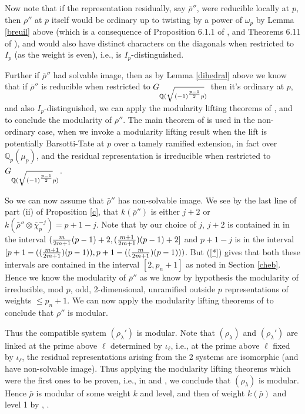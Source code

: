 \documentclass[12pt]{amsart}
\newcommand{\Q}{\mathbb{Q}}
\newcommand{\rhobar}{\overline{\rho}}
\def\rhobar{ {\bar {\rho} } }
\begin{document}
Now note that if the representation residually, say $\rhobar''$, were reducible locally at $p$, then $\rho''$ at $p$ itself would be ordinary up to twisting by 
a power of $\omega_p$ by 
Lemma \ref{breuil} above (which is a consequence of 
Proposition 6.1.1 of \cite{BM}, and Theorems 6.11  of 
 \cite{Savitt1}), and would also
have distinct characters on the diagonals when restricted to $I_p$ (as the weight is even), i.e., is $I_p$-distinguished. 

Further if $\rhobar''$ had solvable image, then  as by 
 Lemma \ref{dihedral} above we know that if $\rhobar''$ is reducible when restricted to $G_{\Q(\sqrt{{(-1)}^{p-1 \over 2}p})}$
then it's ordinary at $p$, and also $I_p$-distinguished, we can apply the modularity lifting theorems of 
\cite{SW2},\cite{SW3} and \cite{Kisin} to conclude the modularity of $\rho''$.
The main theorem of \cite{Kisin}  
is used in the non-ordinary case,
when we invoke a modularity lifting result when the lift is potentially Barsotti-Tate at $p$ over a tamely ramified extension, in fact over $\Q_p(\mu_p)$, and the residual representation is irreducible when restricted to
$G_{\Q(\sqrt{{(-1)}^{p-1 \over 2}}p)}$.


So we can now assume that $\rhobar''$ has non-solvable image. 
We see by the last line of part (ii)  of Proposition \ref{c},
that $k(\rhobar'')$  is either $j+2$ or $k(\rhobar'' \otimes \overline \chi_p^{-j})=p+1-j$. Note that by our choice of $j$, $j+2$ is contained 
in in the interval $({ m \over 2m+1} ({p-1})+2,({ m+1 \over 2m+1}) ({p-1})+2]$ and $p+1-j$
is in the interval
$[p+1-(({ m+1 \over 2m+1}) ({p-1})), p+1-(({ m \over 2m+1}) ({p-1})))$.
 But (\ref{*}) gives that both these intervals are contained in the interval $[2,p_n+1]$  as noted in Section \ref{cheb}.
Hence we know the modularity of $\rhobar''$ as we know by  hypothesis the modularity of irreducible, mod $p$, odd, 2-dimensional, unramified outside $p$ 
representations of weights $\leq p_n+1$.
We can now apply the modularity lifting theorems of 
\cite{Kisin} to conclude that $\rho''$ is modular.

Thus the compatible system $(\rho_\lambda')$ is modular. Note that $(\rho_\lambda)$ 
and $(\rho_\lambda')$ are linked at the prime above $\ell$ determined by $\iota_\ell$, i.e., 
at the prime 
above $\ell$ fixed by $\iota_\ell$, the residual representations 
arising from the 2 systems are isomorphic (and have non-solvable image). Thus applying the modularity lifting theorems which were the first ones to be proven, i.e., in \cite{Wiles} and \cite{TW}, 
we conclude that $(\rho_{\lambda})$ is modular. Hence $\rhobar$ is modular of some weight $k$ and level, and then of weight $k(\rhobar)$ and level 1 
by \cite{Ribet}, \cite{Edix}.
\end{document}
